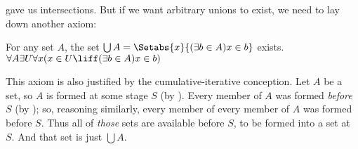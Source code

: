 \documentclass[../../../include/open-logic-section]{subfiles}
\begin{document}
 gave us intersections. But if we want arbitrary unions to exist, we need to lay down another axiom:
\begin{axiom*}[Union] For any set $A$, the set $\bigcup A = \Setabs{x}{(\exists b \in A) x \in b}$ exists.\\
	$\forall A \exists U \forall x(x \in U \liff (\exists b \in A)x \in b)$
\end{axiom*}\noindent 
This axiom is also justified by the cumulative-iterative conception. Let $A$ be a set, so $A$ is formed at some stage $S$ (by \stageshier). Every member of $A$ was formed \emph{before}  $S$ (by \stagesacc); so, reasoning similarly, every member of every member of $A$ was formed before $S$. Thus all of \emph{those} sets are available before $S$, to be formed into a set at $S$. And that set is just $\bigcup A$.
\end{document}
